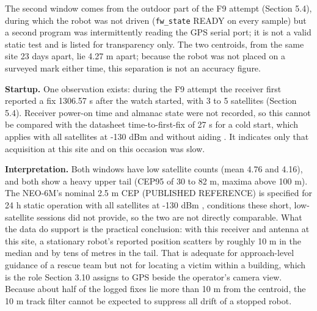 The second window comes from the outdoor part of the F9 attempt (Section 5.4), during which the robot was not driven (\texttt{fw\_state} READY on every sample) but a second program was intermittently reading the GPS serial port; it is not a valid static test and is listed for transparency only. The two centroids, from the same site 23 days apart, lie 4.27 m apart; because the robot was not placed on a surveyed mark either time, this separation is not an accuracy figure.

\textbf{Startup.} One observation exists: during the F9 attempt the receiver first reported a fix 1306.57 s after the watch started, with 3 to 5 satellites (Section 5.4). Receiver power-on time and almanac state were not recorded, so this cannot be compared with the datasheet time-to-first-fix of 27 s for a cold start, which applies with all satellites at -130 dBm and without aiding \cite{ublox_neo6}. It indicates only that acquisition at this site and on this occasion was slow.

\textbf{Interpretation.} Both windows have low satellite counts (mean 4.76 and 4.16), and both show a heavy upper tail (CEP95 of 30 to 82 m, maxima above 100 m). The NEO-6M's nominal 2.5 m CEP (PUBLISHED REFERENCE) is specified for 24 h static operation with all satellites at -130 dBm \cite{ublox_neo6}, conditions these short, low-satellite sessions did not provide, so the two are not directly comparable. What the data do support is the practical conclusion: with this receiver and antenna at this site, a stationary robot's reported position scatters by roughly 10 m in the median and by tens of metres in the tail. That is adequate for approach-level guidance of a rescue team but not for locating a victim within a building, which is the role Section 3.10 assigns to GPS beside the operator's camera view. Because about half of the logged fixes lie more than 10 m from the centroid, the 10 m track filter cannot be expected to suppress all drift of a stopped robot.

